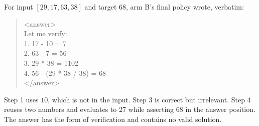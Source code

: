 \documentclass{article}
\begin{document}
For input $[29, 17, 63, 38]$ and target $68$, arm B's final policy wrote, verbatim:

\begin{quote}\ttfamily\small\setlength{\parskip}{0pt}
<answer>\\
Let me verify:\\
1. 17 - 10 = 7\\
2. 63 - 7 = 56\\
3. 29 * 38 = 1102\\
4. 56 - (29 * 38 / 38) = 68\\
</answer>
\end{quote}

Step 1 uses $10$, which is not in the input. Step 3 is correct but irrelevant. Step 4 reuses two numbers and evaluates to 27 while asserting 68 in the answer position. The answer has the form of verification and contains no valid solution.
\end{document}
